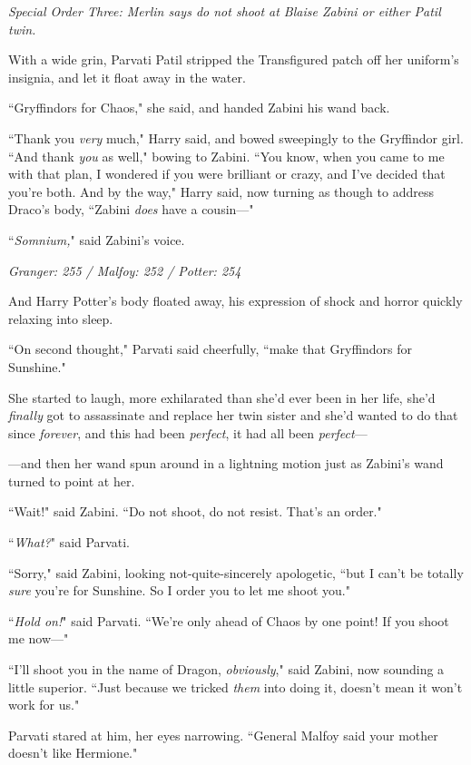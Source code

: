 \emph{Special Order Three: Merlin says do not shoot at Blaise Zabini or either Patil twin.}

With a wide grin, Parvati Patil stripped the Transfigured patch off her uniform's insignia, and let it float away in the water.

``Gryffindors for Chaos," she said, and handed Zabini his wand back.

``Thank you \emph{very} much," Harry said, and bowed sweepingly to the Gryffindor girl. ``And thank \emph{you} as well," bowing to Zabini. ``You know, when you came to me with that plan, I wondered if you were brilliant or crazy, and I've decided that you're both. And by the way," Harry said, now turning as though to address Draco's body, ``Zabini \emph{does} have a cousin—"

``\emph{Somnium,}" said Zabini's voice.

\later

\emph{Granger: 255 / Malfoy: 252 / Potter: 254}

And Harry Potter's body floated away, his expression of shock and horror quickly relaxing into sleep.

``On second thought," Parvati said cheerfully, ``make that Gryffindors for Sunshine."

She started to laugh, more exhilarated than she'd ever been in her life, she'd \emph{finally} got to assassinate and replace her twin sister and she'd wanted to do that since \emph{forever}, and this had been \emph{perfect}, it had all been \emph{perfect}—

—and then her wand spun around in a lightning motion just as Zabini's wand turned to point at her.

``Wait!" said Zabini. ``Do not shoot, do not resist. That's an order."

``\emph{What?}" said Parvati.

``Sorry," said Zabini, looking not-quite-sincerely apologetic, ``but I can't be totally \emph{sure} you're for Sunshine. So I order you to let me shoot you."

``\emph{Hold on!}" said Parvati. ``We're only ahead of Chaos by one point! If you shoot me now—"

``I'll shoot you in the name of Dragon, \emph{obviously}," said Zabini, now sounding a little superior. ``Just because we tricked \emph{them} into doing it, doesn't mean it won't work for us."

Parvati stared at him, her eyes narrowing. ``General Malfoy said your mother doesn't like Hermione."

